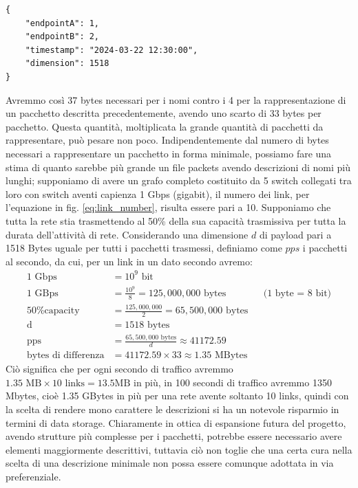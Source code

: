 \documentclass[binding=0.6cm]{sapthesis}
\begin{document}
{\scriptsize %
\begin{lstlisting}[caption={rappresentazione di un pacchetto con descrizione completa}, label={codice:long_description_packet}]
{
    "endpointA": 1,
    "endpointB": 2,
    "timestamp": "2024-03-22 12:30:00",
    "dimension": 1518
}
\end{lstlisting}
}

Avremmo così 37 bytes necessari per i nomi contro i 4 per la rappresentazione di un pacchetto descritta precedentemente, avendo uno scarto di
33 bytes per pacchetto. Questa quantità, moltiplicata la grande quantità di pacchetti da rappresentare, può pesare non poco.
Indipendentemente dal numero di bytes necessari a rappresentare un pacchetto in forma minimale, possiamo fare una stima di quanto sarebbe più grande
un file packets avendo descrizioni di nomi più lunghi; supponiamo di avere un grafo completo costituito da 5 switch collegati tra loro con switch
aventi capienza 1 Gbps (gigabit), il numero dei link, per l'equazione in fig. \ref{eq:link_number}, risulta essere pari a 10. Supponiamo che tutta la rete
stia trasmettendo al 50\% della sua capacità trasmissiva per tutta la durata dell'attività di rete. Considerando una dimensione \(d\) di payload pari 
a 1518 Bytes uguale per tutti i pacchetti trasmessi,
definiamo come \(pps\) i pacchetti al secondo, da cui, per un link in un dato secondo avremo:
\begin{align*}
    \text{1 Gbps} &= 10^9 \text{ bit}\\
    \text{1 GBps} &= \frac{10^9}{8} = 125,000,000 \text{ bytes} && \text{(1 byte = 8 bit)} \\
    \text{50\% capacity} &= \frac{125,000,000}{2} = 65,500,000 \text{ bytes}\\
    \text{d} &= 1518 \text{ bytes} \\
    \text{pps} &= \frac{65,500,000 \text{ bytes}}{d}\approx 41172.59\\
    \text{bytes di differenza} &= 41172.59 \times 33 \approx 1.35 \text{ MBytes}
\end{align*}
Ciò significa che per ogni secondo di traffico avremmo \(1.35 \text{ MB} \times 10\text{ links} = 13.5 \text{MB}\) in più, 
 in 100 secondi di traffico avremmo 1350 Mbytes, cioè 1.35 GBytes in più per una rete avente soltanto 10 links, quindi con la scelta di rendere
  mono carattere le descrizioni
 si ha un notevole risparmio in termini di data storage. Chiaramente in ottica di espansione futura del progetto, avendo strutture più complesse
 per i pacchetti, potrebbe essere necessario avere elementi maggiormente descrittivi, tuttavia ciò non toglie che una certa cura nella scelta di una 
 descrizione minimale non possa essere comunque adottata in via preferenziale.
\end{document}
